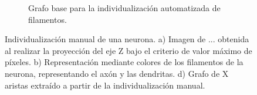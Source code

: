 \begin{figure}[h!]
\begin{subfigure}[t]{0.33\textwidth}
        \caption{Grafo base para la individualizaci\'on automatizada de filamentos.}
        \label{fig:Porta18-3a1-graph}
    \end{subfigure}
    \caption{Individualizaci\'on manual de una neurona. a) Imagen de ... obtenida al realizar la proyecci\'on del eje Z bajo el criterio de valor m\'aximo de p\'ixeles. b) Representaci\'on mediante colores de los filamentos de la neurona, representando el ax\'on y las dendritas. d) Grafo de X aristas extra\'ido a partir de la individualizaci\'on manual.}
    \label{fig:Porta18-3a1}
\end{figure}
